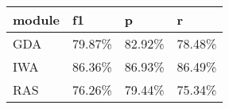 \begin{tabular}{llll}
\toprule
module &      f1 &       p &       r \\
\midrule
   GDA &  79.87\% &  82.92\% &  78.48\% \\
   IWA &  86.36\% &  86.93\% &  86.49\% \\
   RAS &  76.26\% &  79.44\% &  75.34\% \\
\bottomrule
\end{tabular}
